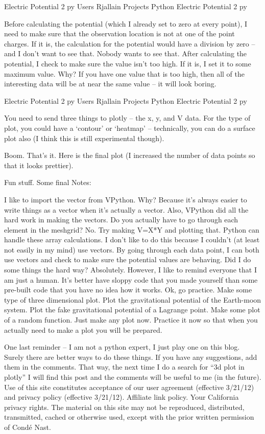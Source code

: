  Electric Potential 2 py    Users Rjallain Projects Python Electric Potential 2 py 

Before calculating the potential (which I already set to zero at every point), I need to make sure that the observation location is not at one of the point charges. If it is, the calculation for the potential would have a division by zero – and I don’t want to see that. Nobody wants to see that. After calculating the potential, I check to make sure the value isn’t too high. If it is, I set it to some maximum value. Why? If you have one value that is too high, then all of the interesting data will be at near the same value – it will look boring.

 Electric Potential 2 py    Users Rjallain Projects Python Electric Potential 2 py 

You need to send three things to plotly – the x, y, and V data. For the type of plot, you could have a ‘contour’ or ‘heatmap’ – technically, you can do a surface plot also (I think this is still experimental though).

Boom. That’s it. Here is the final plot (I increased the number of data points so that it looks prettier).


Fun stuff. Some final Notes:

I like to import the vector from VPython. Why? Because it’s always easier to write things as a vector when it’s actually a vector. Also, VPython did all the hard work in making the vectors.
Do you actually have to go through each element in the meshgrid? No. Try making V=X*Y and plotting that. Python can handle these array calculations. I don’t like to do this because I couldn’t (at least not easily in my mind) use vectors. By going through each data point, I can both use vectors and check to make sure the potential values are behaving.
Did I do some things the hard way? Absolutely. However, I like to remind everyone that I am just a human. It’s better have sloppy code that you made yourself than some pre-built code that you have no idea how it works.
Ok, go practice. Make some type of three dimensional plot. Plot the gravitational potential of the Earth-moon system. Plot the fake gravitational potential of a Lagrange point. Make some plot of a random function. Just make any plot now. Practice it now so that when you actually need to make a plot you will be prepared.

One last reminder – I am not a python expert, I just play one on this blog.  Surely there are better ways to do these things.  If you have any suggestions, add them in the comments.  That way, the next time I do a search for  “3d plot in plotly” I will find this post and the comments will be useful to me (in the future).
Use of this site constitutes acceptance of our user agreement (effective 3/21/12) and privacy policy (effective 3/21/12). Affiliate link policy. Your California privacy rights. The material on this site may not be reproduced, distributed, transmitted, cached or otherwise used, except with the prior written permission of Condé Nast.
